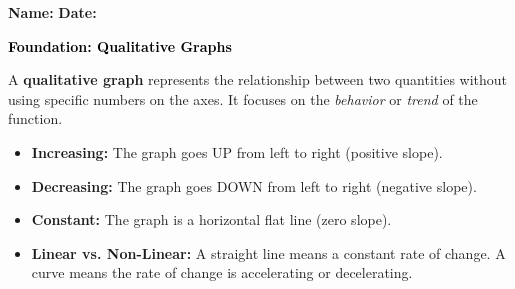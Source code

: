 \documentclass[12pt, letterpaper, fleqn]{article}
\begin{document}
\textbf{Name:} \underline{\hspace{5cm}}
\hfill
\textbf{Date:} \underline{\hspace{3cm}}\\

\begin{tcolorbox}[colback=customteal!20]
    \large\textcolor{black}{\textbf{Foundation: Qualitative Graphs}}
\end{tcolorbox}

\vspace{3mm}

\noindent
A \textbf{qualitative graph} represents the relationship between two quantities without using specific numbers on the axes. It focuses on the \textit{behavior} or \textit{trend} of the function.

\begin{itemize}
    \item \textbf{Increasing:} The graph goes UP from left to right (positive slope).
    \item \textbf{Decreasing:} The graph goes DOWN from left to right (negative slope).
    \item \textbf{Constant:} The graph is a horizontal flat line (zero slope).
    \item \textbf{Linear vs. Non-Linear:} A straight line means a constant rate of change. A curve means the rate of change is accelerating or decelerating.
\end{itemize}

\vspace{4mm}
\end{document}
